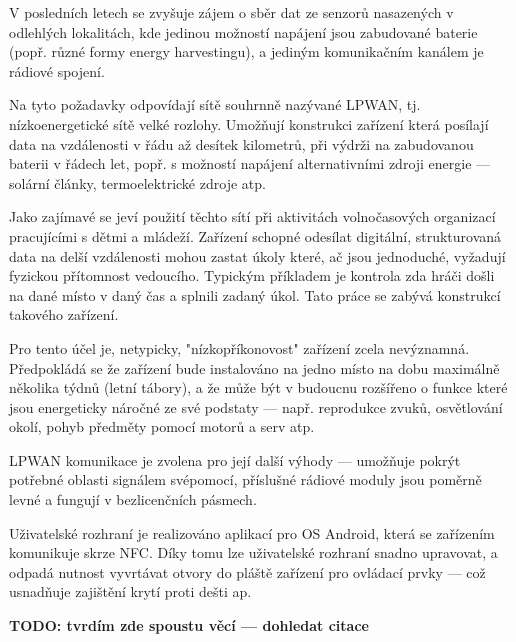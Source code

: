 
V posledních letech se zvyšuje zájem o sběr dat ze senzorů nasazených v odlehlých lokalitách, 
kde jedinou možností napájení jsou zabudované baterie (popř. různé formy energy harvestingu),
a jediným komunikačním kanálem je rádiové spojení.

Na tyto požadavky odpovídají sítě souhrnně nazývané LPWAN, tj. nízkoenergetické sítě velké rozlohy.
Umožňují konstrukci zařízení která posílají data na vzdálenosti v řádu až desítek kilometrů, při výdrži na zabudovanou baterii v řádech let, popř. s možností napájení alternativními zdroji energie --- solární články, termoelektrické zdroje atp.

Jako zajímavé se jeví použití těchto sítí při aktivitách volnočasových organizací pracujícími
s dětmi a mládeží. Zařízení schopné odesílat digitální, strukturovaná data na delší vzdálenosti
mohou zastat úkoly které, ač jsou jednoduché, vyžadují fyzickou přítomnost vedoucího.
Typickým příkladem je kontrola zda hráči došli na dané místo v daný čas a splnili zadaný úkol.
Tato práce se zabývá konstrukcí takového zařízení.

Pro tento účel je, netypicky, "nízkopříkonovost" zařízení zcela nevýznamná. Předpokládá se že zařízení bude instalováno na jedno místo na dobu maximálně několika týdnů (letní tábory), a že může být v budoucnu rozšířeno o funkce které jsou energeticky náročné ze své podstaty --- např. reprodukce zvuků, osvětlování okolí, pohyb předměty pomocí motorů a serv atp.

LPWAN komunikace je zvolena pro její další výhody --- umožňuje pokrýt potřebné oblasti
signálem svépomocí, příslušné rádiové moduly jsou poměrně levné a fungují v bezlicenčních pásmech.

Uživatelské rozhraní je realizováno aplikací pro OS Android, která se zařízením komunikuje skrze NFC.
Díky tomu lze uživatelské rozhraní snadno upravovat, a odpadá nutnost vyvrtávat otvory do pláště
zařízení pro ovládací prvky --- což usnadňuje zajištění krytí proti dešti ap.


\textbf{TODO: tvrdím zde spoustu věcí --- dohledat citace}





